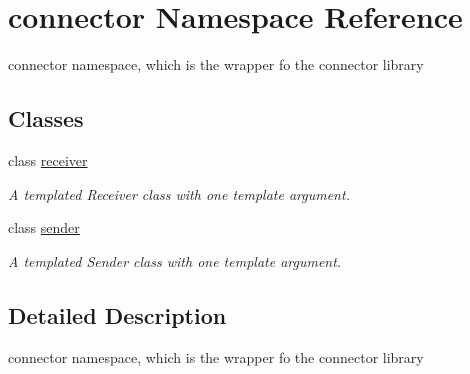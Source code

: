 \hypertarget{namespaceconnector}{}\section{connector Namespace Reference}
\label{namespaceconnector}


connector namespace, which is the wrapper fo the connector library  


\subsection*{Classes}
\begin{DoxyCompactItemize}
\item 
class \hyperlink{classconnector_1_1receiver}{receiver}
\begin{DoxyCompactList}\small\item\em A templated Receiver class with one template argument. \end{DoxyCompactList}\item 
class \hyperlink{classconnector_1_1sender}{sender}
\begin{DoxyCompactList}\small\item\em A templated Sender class with one template argument. \end{DoxyCompactList}\end{DoxyCompactItemize}


\subsection{Detailed Description}
connector namespace, which is the wrapper fo the connector library 

